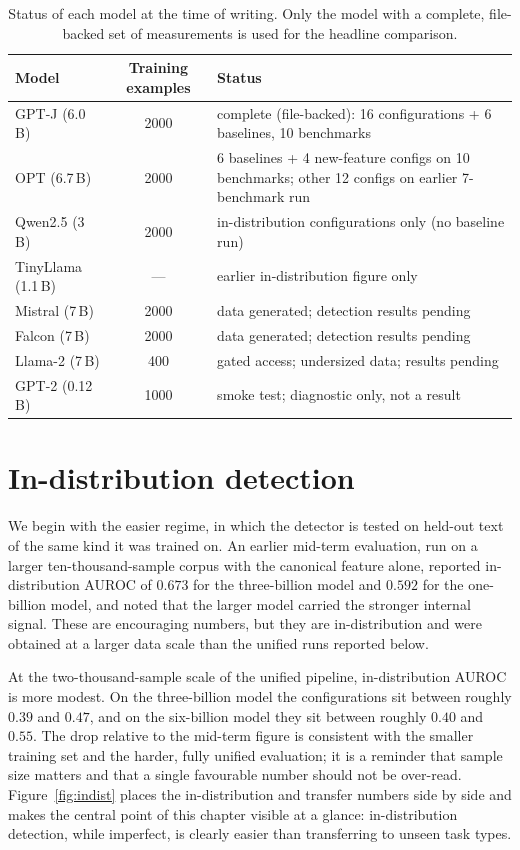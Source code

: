 \begin{table}[h]
\centering
\caption{Status of each model at the time of writing. Only the model with a complete,
file-backed set of measurements is used for the headline comparison.}
\label{tab:status}
\small
\renewcommand{\arraystretch}{1.2}
\begin{tabular}{l c l}
\toprule
\textbf{Model} & \textbf{Training examples} & \textbf{Status} \\
\midrule
GPT-J (6.0\,B)      & 2000 & complete (file-backed): 16 configurations + 6 baselines, 10 benchmarks \\
OPT (6.7\,B)        & 2000 & 6 baselines + 4 new-feature configs on 10 benchmarks; other 12 configs on earlier 7-benchmark run \\
Qwen2.5 (3\,B)      & 2000 & in-distribution configurations only (no baseline run) \\
TinyLlama (1.1\,B)  & ---  & earlier in-distribution figure only \\
Mistral (7\,B)      & 2000 & data generated; detection results pending \\
Falcon (7\,B)       & 2000 & data generated; detection results pending \\
Llama-2 (7\,B)      & 400  & gated access; undersized data; results pending \\
GPT-2 (0.12\,B)     & 1000 & smoke test; diagnostic only, not a result \\
\bottomrule
\end{tabular}
\end{table}

\section{In-distribution detection}

We begin with the easier regime, in which the detector is tested on held-out text of the
same kind it was trained on. An earlier mid-term evaluation, run on a larger
ten-thousand-sample corpus with the canonical feature alone, reported in-distribution
AUROC of $0.673$ for the three-billion model and $0.592$ for the one-billion model, and
noted that the larger model carried the stronger internal signal. These are encouraging
numbers, but they are in-distribution and were obtained at a larger data scale than the
unified runs reported below.

At the two-thousand-sample scale of the unified pipeline, in-distribution AUROC is more
modest. On the three-billion model the configurations sit between roughly $0.39$ and
$0.47$, and on the six-billion model they sit between roughly $0.40$ and $0.55$. The drop
relative to the mid-term figure is consistent with the smaller training set and the harder,
fully unified evaluation; it is a reminder that sample size matters and that a single
favourable number should not be over-read. Figure~\ref{fig:indist} places the in-distribution
and transfer numbers side by side and makes the central point of this chapter visible at a
glance: in-distribution detection, while imperfect, is clearly easier than transferring to
unseen task types.


